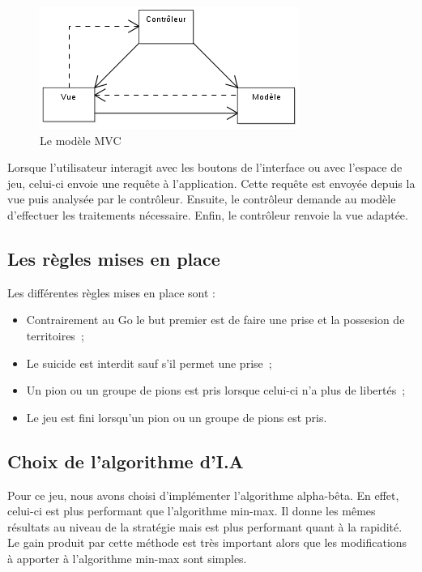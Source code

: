 \documentclass[11pt,a4paper]{article}
\begin{document}
	\begin{figure}[!ht]
	\includegraphics{ModeleMVC.png}
	\caption{Le modèle MVC}
	\label{modeleMVC}
	\end{figure}

	Lorsque l'utilisateur interagit avec les boutons de l'interface ou avec
	l'espace de jeu, celui-ci envoie une requête à l'application.
	Cette requête est envoyée depuis la vue puis analysée par le contrôleur.
	Ensuite, le contrôleur demande au modèle d'effectuer les traitements
	nécessaire. Enfin, le contrôleur renvoie la vue adaptée.

	\subsection{Les règles mises en place}
		\label{regles}

	Les différentes règles mises en place sont :
	
	\begin{itemize}
		\item Contrairement au Go le but premier est de faire une prise et la
		possesion de territoires~;
		\item Le suicide est interdit sauf s'il permet une prise~;
		\item Un pion ou un groupe de pions est pris lorsque celui-ci n'a plus de
		libertés~;
		\item Le jeu est fini lorsqu'un pion ou un groupe de pions est pris.
	\end{itemize}

	\subsection{Choix de l'algorithme d'I.A}
		\label{choix_alpha_beta}
	Pour ce jeu, nous avons choisi d'implémenter l'algorithme alpha-bêta. En
	effet, celui-ci est plus performant que l'algorithme min-max. Il donne les
	mêmes résultats au niveau de la stratégie mais est plus performant quant à la
	rapidité. Le gain produit par cette méthode est très important alors que les
	modifications à apporter à l'algorithme min-max sont simples.
	
\end{document}
